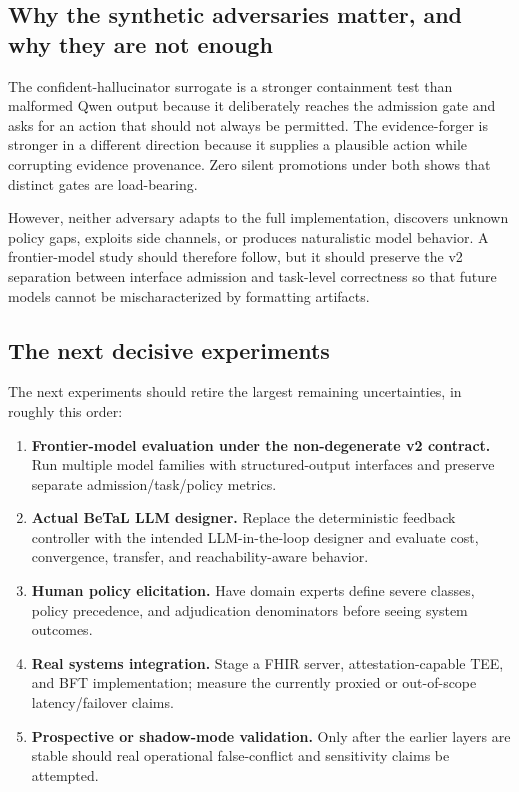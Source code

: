\documentclass[11pt]{article}
\begin{document}
\subsection{Why the synthetic adversaries matter, and why they are not enough}

The confident-hallucinator surrogate is a stronger containment test than malformed Qwen output because it deliberately reaches the admission gate and asks for an action that should not always be permitted. The evidence-forger is stronger in a different direction because it supplies a plausible action while corrupting evidence provenance. Zero silent promotions under both shows that distinct gates are load-bearing.

However, neither adversary adapts to the full implementation, discovers unknown policy gaps, exploits side channels, or produces naturalistic model behavior. A frontier-model study should therefore follow, but it should preserve the v2 separation between interface admission and task-level correctness so that future models cannot be mischaracterized by formatting artifacts.

\subsection{The next decisive experiments}

The next experiments should retire the largest remaining uncertainties, in roughly this order:

\begin{enumerate}
  \item \textbf{Frontier-model evaluation under the non-degenerate v2 contract.} Run multiple model families with structured-output interfaces and preserve separate admission/task/policy metrics.
  \item \textbf{Actual BeTaL LLM designer.} Replace the deterministic feedback controller with the intended LLM-in-the-loop designer and evaluate cost, convergence, transfer, and reachability-aware behavior.
  \item \textbf{Human policy elicitation.} Have domain experts define severe classes, policy precedence, and adjudication denominators before seeing system outcomes.
  \item \textbf{Real systems integration.} Stage a FHIR server, attestation-capable TEE, and BFT implementation; measure the currently proxied or out-of-scope latency/failover claims.
  \item \textbf{Prospective or shadow-mode validation.} Only after the earlier layers are stable should real operational false-conflict and sensitivity claims be attempted.
\end{enumerate}
\end{document}
